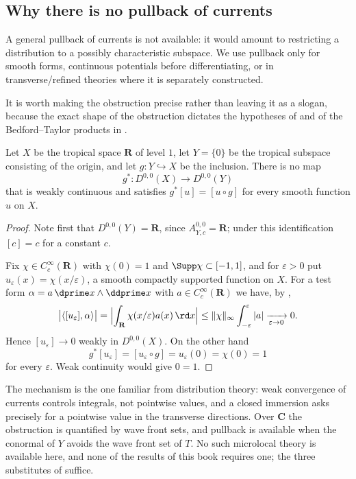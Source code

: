 \subsection{Why there is no pullback of currents}
\label{sec:ch14-pullback-failure}

A general pullback of currents is not available: it would amount to
restricting a distribution to a possibly characteristic subspace.  We use
pullback only for smooth forms, continuous potentials before differentiating,
or in transverse/refined theories where it is separately constructed.

It is worth making the obstruction precise rather than leaving it as a
slogan, because the exact shape of the obstruction dictates the hypotheses of
 and of the Bedford--Taylor products in
.

\begin{proposition}
\label{prop:ch14-no-pullback}
Let $X$ be the tropical space $\mathbf R$ of level $1$, let $Y=\{0\}$ be the
tropical subspace consisting of the origin, and let $g:Y\hookrightarrow X$ be
the inclusion.  There is no map
\[
 g^*:D^{0,0}(X)\longrightarrow D^{0,0}(Y)
\]
that is weakly continuous and satisfies $g^*[u]=[u\circ g]$ for every smooth
function $u$ on $X$.
\end{proposition}

\begin{proof}
Note first that $D^{0,0}(Y)=\mathbf R$, since $A^{0,0}_{Y,c}=\mathbf R$;
under this identification $[c]=c$ for a constant $c$.

Fix $\chi\in C_c^\infty(\mathbf R)$ with $\chi(0)=1$ and
$\Supp\chi\subset[-1,1]$, and for $\varepsilon>0$ put
$u_\varepsilon(x)=\chi(x/\varepsilon)$, a smooth compactly supported function
on $X$.  For a test form $\alpha=a\,\dprime x\wedge\ddprime x$ with
$a\in C_c^\infty(\mathbf R)$ we have, by
,
\[
 \bigl|\langle[u_\varepsilon],\alpha\rangle\bigr|
 =\Bigl|\int_{\mathbf R}\chi(x/\varepsilon)a(x)\,\rd x\Bigr|
 \le\|\chi\|_\infty\int_{-\varepsilon}^{\varepsilon}|a|
 \xrightarrow[\varepsilon\to0]{}0 .
\]
Hence $[u_\varepsilon]\to0$ weakly in $D^{0,0}(X)$.  On the other hand
\[
 g^*[u_\varepsilon]=[u_\varepsilon\circ g]=u_\varepsilon(0)=\chi(0)=1
\]
for every $\varepsilon$.  Weak continuity would give $0=1$.
\end{proof}

\begin{remark}
\label{rem:ch14-pullback-obstruction}
The mechanism is the one familiar from distribution theory: weak convergence
of currents controls integrals, not pointwise values, and a closed immersion
asks precisely for a pointwise value in the transverse directions.  Over
$\mathbf C$ the obstruction is quantified by wave front sets, and pullback is
available when the conormal of $Y$ avoids the wave front set of $T$.  No
such microlocal theory is available here, and none of the results of this
book requires one; the three substitutes of
 suffice.
\end{remark}


